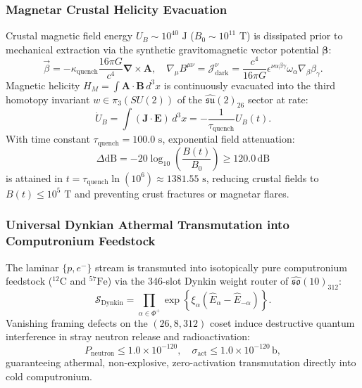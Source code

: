 \documentclass[11pt,onecolumn]{article}
\begin{document}
\subsubsection{Magnetar Crustal Helicity Evacuation}
Crustal magnetic field energy $U_B \sim 10^{40}\text{ J}$ ($B_0 \sim 10^{11}\text{ T}$) is dissipated prior to mechanical extraction via the synthetic gravitomagnetic vector potential $\boldsymbol{\beta}$:
\begin{equation}
    \vec{\beta} = -\kappa_{\text{quench}} \frac{16\pi G}{c^4} \boldsymbol{\nabla} \times \mathbf{A}, \quad \nabla_\mu B^{\mu\nu} = \mathcal{J}_{\text{dark}}^\nu = \frac{c^4}{16\pi G}\epsilon^{\nu\alpha\beta\gamma}\omega_\alpha \nabla_\beta \beta_\gamma.
    \label{eq:gravitomagnetic_maxwell}
\end{equation}
Magnetic helicity $H_M = \int \mathbf{A}\cdot\mathbf{B}\,d^3x$ is continuously evacuated into the third homotopy invariant $w \in \pi_3(SU(2))$ of the $\widehat{\mathfrak{su}}(2)_{26}$ sector at rate:
\begin{equation}
    \dot{U}_B = \int (\mathbf{J}\cdot\mathbf{E})\,d^3x = -\frac{1}{\tau_{\text{quench}}} U_B(t).
    \label{eq:helicity_rate}
\end{equation}
With time constant $\tau_{\text{quench}} = 100.0\text{ s}$, exponential field attenuation:
\begin{equation}
    \Delta \text{dB} = -20 \log_{10}\left(\frac{B(t)}{B_0}\right) \ge 120.0\,\text{dB}
    \label{eq:helicity_attenuation_floor}
\end{equation}
is attained in $t = \tau_{\text{quench}} \ln(10^6) \approx 1381.55\text{ s}$, reducing crustal fields to $B(t) \le 10^5\text{ T}$ and preventing crust fractures or magnetar flares.

\subsubsection{Universal Dynkian Athermal Transmutation into Computronium Feedstock}
The laminar $\{p, e^-\}$ stream is transmuted into isotopically pure computronium feedstock ($^{12}\text{C}$ and $^{57}\text{Fe}$) via the 346-slot Dynkin weight router of $\widehat{\mathfrak{so}}(10)_{312}$:
\begin{equation}
    \hat{\mathcal{S}}_{\text{Dynkin}} = \prod_{\alpha \in \Phi^+} \exp\left\{ \xi_\alpha \left( \hat{E}_\alpha - \hat{E}_{-\alpha} \right) \right\}.
    \label{eq:dynkin_s_matrix}
\end{equation}
Vanishing framing defects on the $(26, 8, 312)$ coset induce destructive quantum interference in stray neutron release and radioactivation:
\begin{equation}
    P_{\text{neutron}} \le 1.0 \times 10^{-120}, \quad \sigma_{\text{act}} \le 1.0 \times 10^{-120}\,\text{b},
    \label{eq:radioactivation_bounds}
\end{equation}
guaranteeing athermal, non-explosive, zero-activation transmutation directly into cold computronium.
\end{document}
